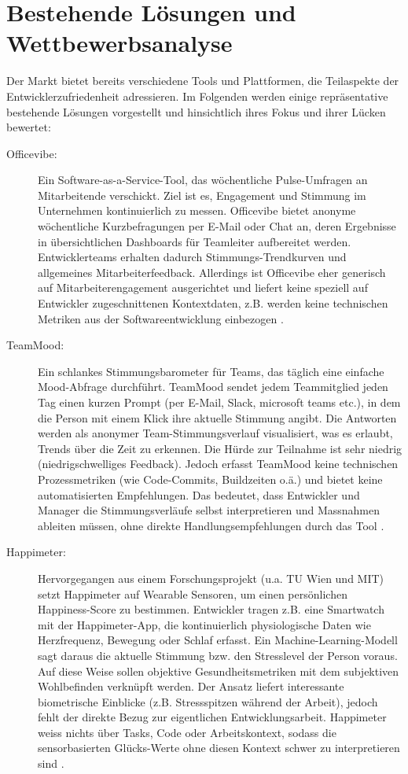 \documentclass[12pt,a4paper]{report}
\begin{document}
\section{Bestehende Lösungen und Wettbewerbsanalyse}

Der Markt bietet bereits verschiedene Tools und Plattformen, die Teilaspekte der Entwicklerzufriedenheit adressieren. Im Folgenden
werden einige repräsentative bestehende Lösungen vorgestellt und hinsichtlich ihres Fokus und ihrer Lücken bewertet:

\begin{description}
  \item[Officevibe:] Ein Software-as-a-Service-Tool, das wöchentliche Pulse-Umfragen an Mitarbeitende verschickt. Ziel ist es,
    Engagement und Stimmung im Unternehmen kontinuierlich zu messen. Officevibe bietet anonyme wöchentliche Kurzbefragungen per
    E-Mail oder Chat an, deren Ergebnisse in übersichtlichen Dashboards für Teamleiter aufbereitet werden. Entwicklerteams erhalten
    dadurch Stimmungs-Trendkurven und allgemeines Mitarbeiterfeedback. Allerdings ist Officevibe eher generisch auf
    Mitarbeiterengagement ausgerichtet und liefert keine speziell auf Entwickler zugeschnittenen Kontextdaten, z.B. werden keine
    technischen Metriken aus der Softwareentwicklung einbezogen \cite{courier_officevibe_2025}.

  \item[TeamMood:] Ein schlankes Stimmungsbarometer für Teams, das täglich eine einfache Mood-Abfrage durchführt. TeamMood sendet
    jedem Teammitglied jeden Tag einen kurzen Prompt (per E-Mail, Slack, microsoft teams etc.), in dem die Person mit einem Klick
    ihre aktuelle Stimmung angibt. Die Antworten werden als anonymer Team-Stimmungsverlauf visualisiert, was es erlaubt, Trends über
    die Zeit zu erkennen. Die Hürde zur Teilnahme ist sehr niedrig (niedrigschwelliges Feedback). Jedoch erfasst TeamMood keine
    technischen Prozessmetriken (wie Code-Commits, Buildzeiten o.ä.) und bietet keine automatisierten Empfehlungen. Das bedeutet,
    dass Entwickler und Manager die Stimmungsverläufe selbst interpretieren und Massnahmen ableiten müssen, ohne direkte
    Handlungsempfehlungen durch das Tool \cite{revelo_teammood_2025}.

  \item[Happimeter:] Hervorgegangen aus einem Forschungsprojekt (u.a. TU Wien und MIT) setzt Happimeter auf Wearable Sensoren, um
    einen persönlichen Happiness-Score zu bestimmen. Entwickler tragen z.B. eine Smartwatch mit der Happimeter-App, die
    kontinuierlich physiologische Daten wie Herzfrequenz, Bewegung oder Schlaf erfasst. Ein Machine-Learning-Modell sagt daraus
    die aktuelle Stimmung bzw. den Stresslevel der Person voraus. Auf diese Weise sollen objektive Gesundheitsmetriken mit dem
    subjektiven Wohlbefinden verknüpft werden. Der Ansatz liefert interessante biometrische Einblicke (z.B. Stressspitzen während
    der Arbeit), jedoch fehlt der direkte Bezug zur eigentlichen Entwicklungsarbeit. Happimeter weiss nichts über Tasks, Code oder
    Arbeitskontext, sodass die sensorbasierten Glücks-Werte ohne diesen Kontext schwer zu interpretieren sind
    \cite{budner_making_2017}.


\end{description}
\end{document}
